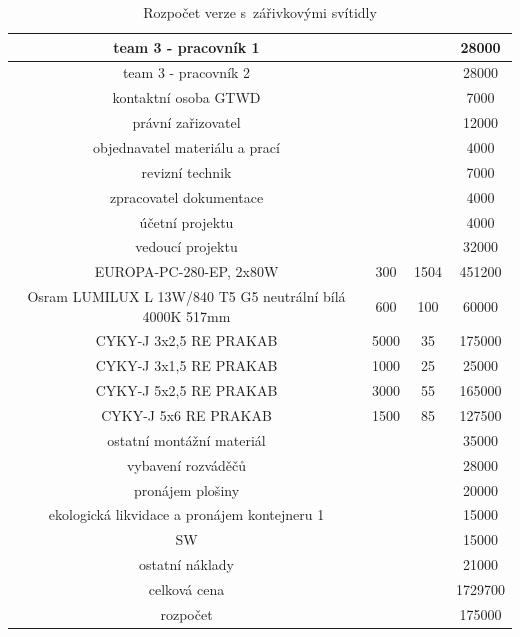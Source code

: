 \documentclass[a4paper, twoside, 11pt]{article}
\begin{document}
\begin{table}[H]
\begin{tabular}{ !{\vrule width 2pt} c | c | c | c  !{\vrule width 2pt}}
				team 3 - pracovník 1 && 28000\\ \hline
				team 3 - pracovník 2 && 28000\\ \hline
				kontaktní osoba GTWD && 7000\\ \hline
				právní zařizovatel && 12000\\ \hline
				objednavatel materiálu a prací && 4000\\ \hline
				revizní technik && 7000\\ \hline
				zpracovatel dokumentace && 4000\\ \hline
				účetní projektu && 4000\\ \hline
				vedoucí projektu && 32000\\ \hline
				EUROPA-PC-280-EP, 2x80W & 300 & 1504 & 451200\\ \hline
				Osram LUMILUX L 13W/840 T5 G5 neutrální bílá 4000K 517mm & 600 & 100 & 60000\\ \hline
				CYKY-J 3x2,5 RE PRAKAB & 5000 & 35 & 175000\\ \hline
				CYKY-J 3x1,5 RE PRAKAB & 1000 & 25 & 25000\\ \hline
				CYKY-J 5x2,5 RE PRAKAB & 3000 & 55 & 165000\\ \hline
				CYKY-J 5x6 RE PRAKAB & 1500 & 85 & 127500\\ \hline
				ostatní montážní materiál && 35000\\ \hline
				vybavení rozváděčů && 28000\\ \hline
				pronájem plošiny && 20000\\ \hline
				ekologická likvidace a pronájem kontejneru 1 && 15000\\ \hline
				SW && 15000\\ \hline
				ostatní náklady && 21000\\ 
				celková cena && 1729700\\ \hline
				rozpočet && 175000\\ \hline
				
				\end{tabular}
			\caption{Rozpočet verze s~zářivkovými svítidly}
			\end{table}
		
\end{document}
